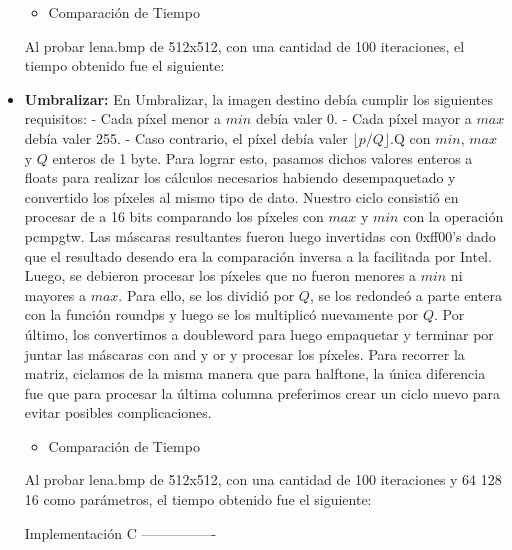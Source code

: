 \documentclass[10pt, a4paper]{article}
\begin{document}
\begin{itemize}
\begin{itemize}
\item{Comparación de Tiempo}
\end{itemize}
Al probar lena.bmp de 512x512, con una cantidad de 100 iteraciones, el tiempo obtenido fue el siguiente:\newline


\item {\textbf{Umbralizar:}}
En Umbralizar, la imagen destino debía cumplir los siguientes requisitos:\newline
- Cada píxel menor a $min$ debía valer 0.\newline
- Cada píxel mayor a $max$ debía valer 255.\newline
- Caso contrario, el píxel debía valer $\lfloor p/Q \rfloor$.Q\newline
con $min$, $max$ y $Q$ enteros de 1 byte.\newline
Para lograr esto, pasamos dichos valores enteros a floats para realizar los cálculos necesarios habiendo desempaquetado y convertido los píxeles al mismo tipo de dato.\newline
Nuestro ciclo consistió en procesar de a 16 bits comparando los píxeles con $max$ y $min$ con la operación pcmpgtw. Las máscaras resultantes fueron luego invertidas con 0xff00's dado que el resultado deseado era la comparación inversa a la facilitada por Intel. Luego, se debieron procesar los píxeles que no fueron menores a $min$ ni mayores a $max$. Para ello, se los dividió por $Q$, se los redondeó a parte entera con la función roundps y luego se los multiplicó nuevamente por $Q$. Por último, los convertimos a doubleword para luego empaquetar y terminar por juntar las máscaras con and y or y procesar los píxeles.\newline
Para recorrer la matriz, ciclamos de la misma manera que para halftone, la única diferencia fue que para procesar la última columna preferimos crear un ciclo nuevo para evitar posibles complicaciones.

\begin{itemize}
\item{Comparación de Tiempo}
\end{itemize}
Al probar lena.bmp de 512x512, con una cantidad de 100 iteraciones y 64 128 16 como parámetros, el tiempo obtenido fue el siguiente: \newline

Implementación C\newline
----------------\newline


\end{itemize}
\end{document}
